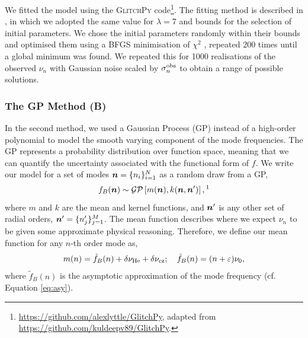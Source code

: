 We fitted the model using the \textsc{GlitchPy} code\footnote{\url{https://github.com/alexlyttle/GlitchPy}, adapted from \url{https://github.com/kuldeepv89/GlitchPy}.}. The fitting method is described in \citet{Verma.Raodeo.ea2019}, in which we adopted the same value for \(\lambda=7\) and bounds for the selection of initial parameters. We chose the initial parameters randomly within their bounds and optimised them using a BFGS minimisation of \(\chi^2\) \citep{Fletcher1987}, repeated 200 times until a global minimum was found. We repeated this for 1000 realisations of the observed \(\nu_n\) with Gaussian noise scaled by \(\sigma_n^{{\mathrm{obs}}}\) to obtain a range of possible solutions.

\subsubsection{The GP Method (B)}

In the second method, we used a Gaussian Process (GP) instead of a high-order polynomial to model the smooth varying component of the mode frequencies. The GP represents a probability distribution over function space, meaning that we can quantify the uncertainty associated with the functional form of $f$. We write our model for a set of modes \(\bm{n} = \{n_i\}_{i=1}^N\) as a random draw from a GP,
%
\begin{equation}
    f_{B}(\vect{n}) \sim \mathcal{GP}\left[ m(\vect{n}), k(\vect{n}, \vect{n}') \right],\text{\footnotemark}
\end{equation}
%
%
where \(m\) and \(k\) are the mean and kernel functions, and \(\bm{n}'\) is any other set of radial orders, \(\bm{n}' = \{n'_j\}_{j=1}^M\). The mean function describes where we expect \(\nu_n\) to be given some approximate physical reasoning. Therefore, we define our mean function for any \(n\)-th order mode as,
%
\begin{equation}
    m(n) = \tilde{f}_B(n) + \delta\nu_{{\mathrm{He}}} + \delta\nu_{{\mathrm{cz}}}; \quad \tilde{f}_B(n) = (n + \varepsilon) \nu_0, \label{eq:asy-glitch}
\end{equation}
%
where \(\tilde{f}_B(n)\) is the asymptotic approximation of the mode frequency (cf. Equation \ref{eq:asy}).

